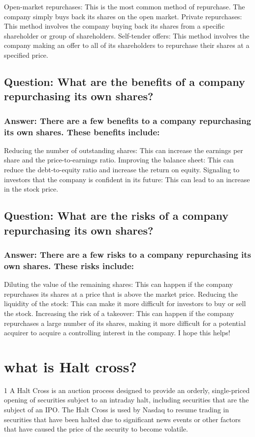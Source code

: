 \documentclass[11pt]{article}
\begin{document}
Open-market repurchases: This is the most common method of repurchase. The company simply buys back its shares on the open market.
Private repurchases: This method involves the company buying back its shares from a specific shareholder or group of shareholders.
Self-tender offers: This method involves the company making an offer to all of its shareholders to repurchase their shares at a specified price.
\subsection{Question: What are the benefits of a company repurchasing its own shares?}
\label{sec:org8b59833}

\subsubsection{Answer: There are a few benefits to a company repurchasing its own shares. These benefits include:}
\label{sec:org2c23168}

Reducing the number of outstanding shares: This can increase the earnings per share and the price-to-earnings ratio.
Improving the balance sheet: This can reduce the debt-to-equity ratio and increase the return on equity.
Signaling to investors that the company is confident in its future: This can lead to an increase in the stock price.
\subsection{Question: What are the risks of a company repurchasing its own shares?}
\label{sec:orgc52b4bb}

\subsubsection{Answer: There are a few risks to a company repurchasing its own shares. These risks include:}
\label{sec:org4e3917a}

Diluting the value of the remaining shares: This can happen if the company repurchases its shares at a price that is above the market price.
Reducing the liquidity of the stock: This can make it more difficult for investors to buy or sell the stock.
Increasing the risk of a takeover: This can happen if the company repurchases a large number of its shares, making it more difficult for a potential acquirer to acquire a controlling interest in the company.
I hope this helps!

\section{what is Halt cross?}
\label{sec:org3f01a10}
1
A Halt Cross is an auction process designed to provide an orderly, single-priced opening of securities subject to an intraday halt, including securities that are the subject of an IPO. The Halt Cross is used by Nasdaq to resume trading in securities that have been halted due to significant news events or other factors that have caused the price of the security to become volatile.
\end{document}
